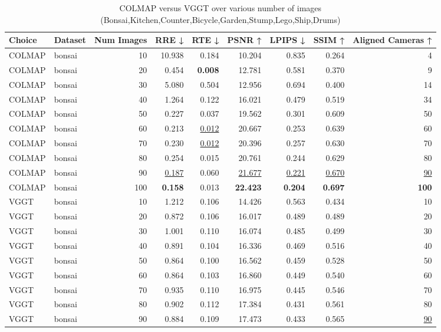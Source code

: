 \begin{table}[H]
\caption{COLMAP versus VGGT over various number of images (Bonsai,Kitchen,Counter,Bicycle,Garden,Stump,Lego,Ship,Drums)}
\label{tab:01_num_images_bonsai,kitchen,counter,bicycle,garden,stump,lego,ship,drums}
\small
\begin{tabular}{llrrrrrrr}
\toprule
Choice & Dataset & Num Images & RRE ↓ & RTE ↓ & PSNR ↑ & LPIPS ↓ & SSIM ↑ & Aligned Cameras ↑ \\
\midrule
COLMAP & bonsai & 10 & 10.938 & 0.184 & 10.204 & 0.835 & 0.264 & 4 \\
COLMAP & bonsai & 20 & 0.454 & \textbf{0.008} & 12.781 & 0.581 & 0.370 & 9 \\
COLMAP & bonsai & 30 & 5.080 & 0.504 & 12.956 & 0.694 & 0.400 & 14 \\
COLMAP & bonsai & 40 & 1.264 & 0.122 & 16.021 & 0.479 & 0.519 & 34 \\
COLMAP & bonsai & 50 & 0.227 & 0.037 & 19.562 & 0.301 & 0.609 & 50 \\
COLMAP & bonsai & 60 & 0.213 & \underline{0.012} & 20.667 & 0.253 & 0.639 & 60 \\
COLMAP & bonsai & 70 & 0.230 & \underline{0.012} & 20.396 & 0.257 & 0.630 & 70 \\
COLMAP & bonsai & 80 & 0.254 & 0.015 & 20.761 & 0.244 & 0.629 & 80 \\
COLMAP & bonsai & 90 & \underline{0.187} & 0.060 & \underline{21.677} & \underline{0.221} & \underline{0.670} & \underline{90} \\
COLMAP & bonsai & 100 & \textbf{0.158} & 0.013 & \textbf{22.423} & \textbf{0.204} & \textbf{0.697} & \textbf{100} \\
VGGT & bonsai & 10 & 1.212 & 0.106 & 14.426 & 0.563 & 0.434 & 10 \\
VGGT & bonsai & 20 & 0.872 & 0.106 & 16.017 & 0.489 & 0.489 & 20 \\
VGGT & bonsai & 30 & 1.001 & 0.110 & 16.074 & 0.485 & 0.499 & 30 \\
VGGT & bonsai & 40 & 0.891 & 0.104 & 16.336 & 0.469 & 0.516 & 40 \\
VGGT & bonsai & 50 & 0.864 & 0.100 & 16.562 & 0.459 & 0.528 & 50 \\
VGGT & bonsai & 60 & 0.864 & 0.103 & 16.860 & 0.449 & 0.540 & 60 \\
VGGT & bonsai & 70 & 0.935 & 0.110 & 16.975 & 0.445 & 0.546 & 70 \\
VGGT & bonsai & 80 & 0.902 & 0.112 & 17.384 & 0.431 & 0.561 & 80 \\
VGGT & bonsai & 90 & 0.884 & 0.109 & 17.473 & 0.433 & 0.565 & \underline{90} \\

\end{tabular}
\end{table}
